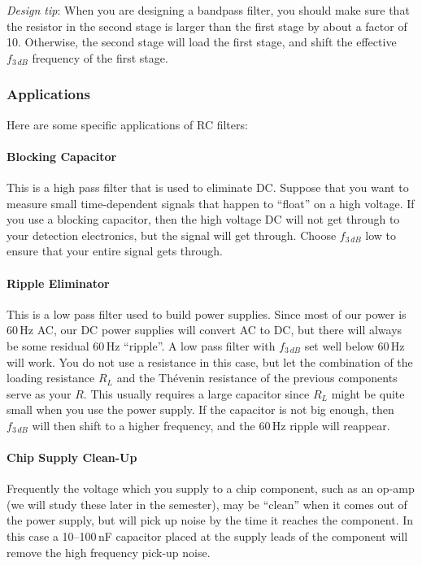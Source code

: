 \documentclass{article}
\begin{document}
\emph{Design tip}: When you are designing a bandpass filter, you should make sure that the resistor in the second stage is larger than the first stage by about a factor of 10. Otherwise, the second stage will load the first stage, and shift the effective $f_{3\,dB}$ frequency of the first stage.

\subsubsection{Applications}
Here are some specific applications of RC filters:

\paragraph{Blocking Capacitor}
This is a high pass filter that is used to eliminate DC. Suppose that you want to measure small time-dependent signals that happen to ``float'' on a high voltage. If you use a blocking capacitor, then the high voltage DC will not get through to your detection electronics, but the signal will get through. Choose $f_{3\,dB}$ low to ensure that your entire signal gets through.
 
\paragraph{Ripple Eliminator}
This is a low pass filter used to build power supplies. Since most of our power is 60\,Hz AC, our DC power supplies will convert AC to DC, but there will always be some residual 60\,Hz ``ripple''. A low pass filter with $f_{3\,dB}$ set well below 60\,Hz will work. You do not use a resistance in this case, but let the combination of the loading resistance $R_L$ and the Th\'{e}venin resistance of the previous components serve as your $R$. This usually requires a large capacitor since $R_L$ might be quite small when you use the power supply. If the capacitor is not big enough, then $f_{3\,dB}$ will then shift to a higher frequency, and the 60\,Hz ripple will reappear.

\paragraph{Chip Supply Clean-Up}
Frequently the voltage which you supply to a chip component, such as an op-amp (we will study these later in the semester), may be ``clean'' when it comes out of the power supply, but will pick up noise by the time it reaches the component. In this case a 10--100\,nF capacitor placed at the supply leads of the component will remove the high frequency pick-up noise.
\end{document}
